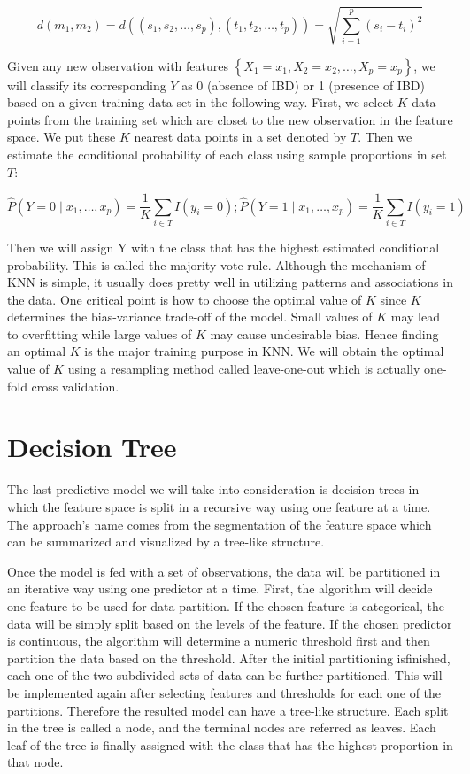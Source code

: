 \documentclass[preprint, 3p,
authoryear]{elsarticle} %
\begin{document}
\[
d\left(m_{1}, m_{2}\right)=d\left(\left(s_{1}, s_{2}, \ldots, s_{p}\right),\left(t_{1}, t_{2}, \ldots, t_{p}\right)\right)=\sqrt{\sum_{i=1}^{p}\left(s_{i}-t_{i}\right)^{2}}
\]

Given any new observation with features
\(\left\{X_{1}=x_{1}, X_{2}=x_{2}, \ldots, X_{p}=x_{p}\right\}\), we
will classify its corresponding \(Y\) as 0 (absence of IBD) or 1
(presence of IBD) based on a given training data set in the following
way. First, we select \(K\) data points from the training set which are
closet to the new observation in the feature space. We put these \(K\)
nearest data points in a set denoted by \(T\). Then we estimate the
conditional probability of each class using sample proportions in set
\(T\):

\[
\hat{P}\left(Y=0 \mid x_{1}, \ldots, x_{p}\right)=\frac{1}{K} \sum_{i \in T} I\left(y_{i}=0\right) ; \hat{P}\left(Y=1 \mid x_{1}, \ldots, x_{p}\right)=\frac{1}{K} \sum_{i \in T} I\left(y_{i}=1\right)
\]

Then we will assign Y with the class that has the highest estimated
conditional probability. This is called the majority vote rule. Although
the mechanism of KNN is simple, it usually does pretty well in utilizing
patterns and associations in the data. One critical point is how to
choose the optimal value of \(K\) since \(K\) determines the
bias-variance trade-off of the model. Small values of \(K\) may lead to
overfitting while large values of \(K\) may cause undesirable bias.
Hence finding an optimal \(K\) is the major training purpose in KNN. We
will obtain the optimal value of \(K\) using a resampling method called
leave-one-out which is actually one-fold cross validation.

\hypertarget{decision-tree}{%
\section{Decision Tree}\label{decision-tree}}

The last predictive model we will take into consideration is decision
trees in which the feature space is split in a recursive way using one
feature at a time. The approach's name comes from the segmentation of
the feature space which can be summarized and visualized by a tree-like
structure.

Once the model is fed with a set of observations, the data will be
partitioned in an iterative way using one predictor at a time. First,
the algorithm will decide one feature to be used for data partition. If
the chosen feature is categorical, the data will be simply split based
on the levels of the feature. If the chosen predictor is continuous, the
algorithm will determine a numeric threshold first and then partition
the data based on the threshold. After the initial partitioning
isfinished, each one of the two subdivided sets of data can be further
partitioned. This will be implemented again after selecting features and
thresholds for each one of the partitions. Therefore the resulted model
can have a tree-like structure. Each split in the tree is called a node,
and the terminal nodes are referred as leaves. Each leaf of the tree is
finally assigned with the class that has the highest proportion in that
node.
\end{document}

